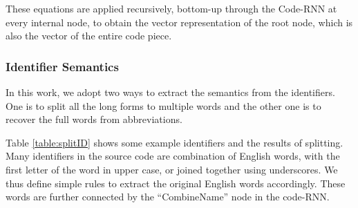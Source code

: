 
These equations are applied recursively, bottom-up through the Code-RNN at
every internal node, to obtain the vector representation of the root node,
which is also the vector of the entire code piece.

\subsubsection{Identifier Semantics}
\label{sec:identifier}


In this work, we adopt two ways to extract the semantics from the identifiers.
One is to split all the long forms to multiple words and
the other one is to recover the full words from abbreviations.

Table \ref{table:splitID} shows some example identifiers and the results
of splitting. Many identifiers in the source code are combination of English words,
with the first letter of the word in upper case, or joined together using
underscores. We thus define simple rules to extract the original
English words accordingly. These words are further connected by the
``CombineName'' node in the code-RNN.


